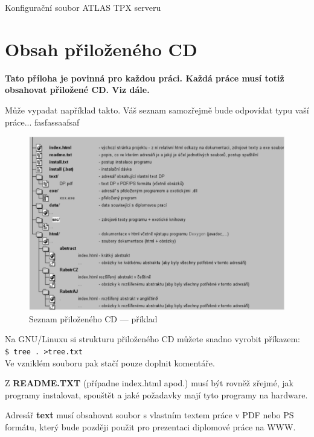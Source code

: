 \documentclass[11pt,twoside,a4paper]{book}
\begin{document}
\begin{code}[th!]
\caption{Konfigurační soubor ATLAS TPX serveru}
\end{code}


\chapter{Obsah přiloženého CD}
\textbf{\large Tato příloha je povinná pro každou práci. Každá práce musí totiž obsahovat přiložené CD. Viz dále.}

Může vypadat například takto. Váš seznam samozřejmě bude odpovídat typu vaší práce... \cite{TurecekThesis2011} fasfassaafsaf

\begin{figure}[h]
\begin{center}
\includegraphics[width=14cm]{figures/seznamcd}
\caption{Seznam přiloženého CD --- příklad}
\label{fig:seznamcd}
\end{center}
\end{figure}

Na GNU/Linuxu si strukturu přiloženého CD můžete snadno vyrobit příkazem:\\ 
\verb|$ tree . >tree.txt|\\
Ve vzniklém souboru pak stačí pouze doplnit komentáře.

Z \textbf{README.TXT} (případne index.html apod.)  musí být rovněž zřejmé, jak programy instalovat, spouštět a jaké požadavky mají tyto programy na hardware.

Adresář \textbf{text}  musí obsahovat soubor s vlastním textem práce v PDF nebo PS formátu, který bude později použit pro prezentaci diplomové práce na WWW.
\end{document}
